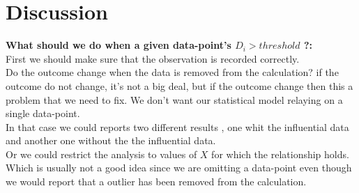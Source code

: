 \documentclass{article}[20pt]
\begin{document}
\newpage

\section{Discussion}
{ \bf What should we do when a given data-point's $D_i > threshold$ ?:}\\


First we should make sure that the observation is recorded correctly.\\
Do the outcome change when the data is removed from the calculation? if the outcome do not change, it's not a big deal, but if the outcome change then this a problem that we need to fix. We don't want our statistical model relaying on a single data-point.\\

In that case we could reports two different results , one whit the influential data and another one without the the influential data.\\

Or we could restrict the analysis to values of $X$ for which the relationship holds. Which is usually not a good idea since we are omitting a data-point even though we would report that a outlier has been removed from the calculation. 



\bigskip




\end{document}
